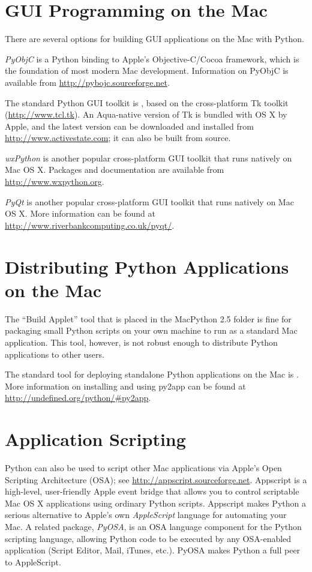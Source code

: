 \section{GUI Programming on the Mac}

There are several options for building GUI applications on the Mac with Python.

\emph{PyObjC} is a Python binding to Apple's Objective-C/Cocoa framework, which
is the foundation of most modern Mac development. Information on PyObjC is
available from \url{http://pybojc.sourceforge.net}.

The standard Python GUI toolkit is , based on the cross-platform
Tk toolkit (\url{http://www.tcl.tk}). An Aqua-native version of Tk is bundled
with OS X by Apple, and the latest version can be downloaded and installed from
\url{http://www.activestate.com}; it can also be built from source.

\emph{wxPython} is another popular cross-platform GUI toolkit that runs natively
on Mac OS X. Packages and documentation are available from
\url{http://www.wxpython.org}.

\emph{PyQt} is another popular cross-platform GUI toolkit that runs natively on
Mac OS X. More information can be found at
\url{http://www.riverbankcomputing.co.uk/pyqt/}.


\section{Distributing Python Applications on the Mac}

The ``Build Applet'' tool that is placed in the MacPython 2.5 folder is fine for
packaging small Python scripts on your own machine to run as a standard Mac
application. This tool, however, is not robust enough to distribute Python
applications to other users.

The standard tool for deploying standalone Python applications on the Mac is
. More information on installing and using py2app can be found
at \url{http://undefined.org/python/\#py2app}.

\section{Application Scripting}

Python can also be used to script other Mac applications via Apple's Open
Scripting Architecture (OSA); see
\url{http://appscript.sourceforge.net}. Appscript is a high-level, user-friendly
Apple event bridge that allows you to control scriptable Mac OS X applications
using ordinary Python scripts. Appscript makes Python a serious alternative to
Apple's own \emph{AppleScript} language for automating your Mac. A related
package, \emph{PyOSA}, is an OSA language component for the Python scripting
language, allowing Python code to be executed by any OSA-enabled application
(Script Editor, Mail, iTunes, etc.). PyOSA makes Python a full peer to
AppleScript.

